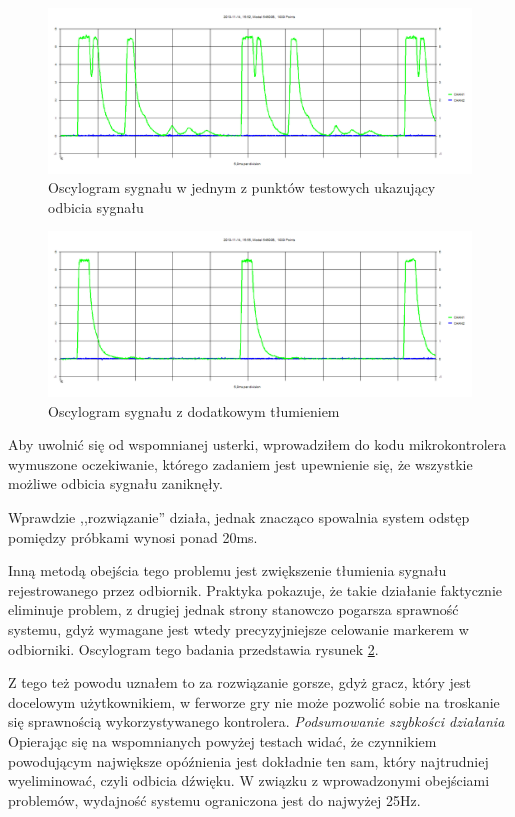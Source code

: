 \begin{figure}
 \includegraphics[width=\textwidth]{gfx/oscyloskop_1.png}
 \caption[Oscylogram sygnału w punkcie testowym]{Oscylogram sygnału w jednym z punktów testowych ukazujący odbicia sygnału}
 \label{fig:oscilloscope}
\end{figure}

\begin{figure}
 \includegraphics[width=\textwidth]{gfx/oscyloskop_attenuated.png}
 \caption{Oscylogram sygnału z dodatkowym tłumieniem}
 \label{fig:oscilloscope_attenuated}
\end{figure}


Aby uwolnić się od wspomnianej usterki, wprowadziłem do kodu mikrokontrolera wymuszone oczekiwanie, którego zadaniem jest upewnienie się, że wszystkie możliwe odbicia sygnału zaniknęły.

Wprawdzie ,,rozwiązanie'' działa, jednak znacząco spowalnia system \ppauza odstęp pomiędzy próbkami wynosi ponad 20ms.

Inną metodą obejścia tego problemu jest zwiększenie tłumienia sygnału rejestrowanego przez odbiornik. Praktyka pokazuje, że takie działanie faktycznie eliminuje problem, z drugiej jednak strony stanowczo pogarsza sprawność systemu, gdyż wymagane jest wtedy precyzyjniejsze celowanie markerem w odbiorniki. Oscylogram tego badania przedstawia rysunek \ref{fig:oscilloscope_attenuated}.

Z tego też powodu uznałem to za rozwiązanie gorsze, gdyż gracz, który jest docelowym użytkownikiem, w ferworze gry nie może pozwolić sobie na troskanie się sprawnością wykorzystywanego kontrolera.
\newline
\newline
\textsl{Podsumowanie szybkości działania}
Opierając się na wspomnianych powyżej testach widać, że czynnikiem powodującym największe opóźnienia jest dokładnie ten sam, który najtrudniej wyeliminować, czyli odbicia dźwięku. W związku z wprowadzonymi obejściami problemów, wydajność systemu ograniczona jest do najwyżej 25Hz.

